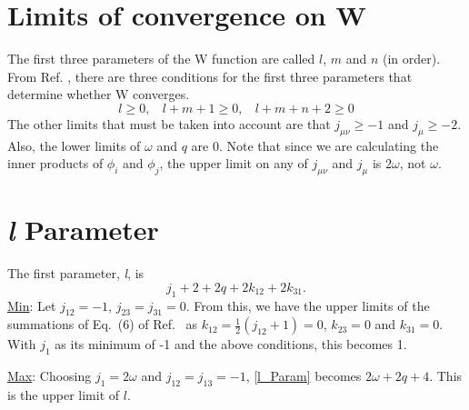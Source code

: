 \documentclass[Dissertation.tex]{subfiles}
\begin{document}
\section{Limits of convergence on W}

The first three parameters of the W function are called $l$, $m$ and $n$
(in order). From Ref. \cite{Drake1995}, there are three conditions for the first
three parameters that determine whether W converges.
\[l \geq 0, ~~~~ l+m+1 \geq 0, ~~~~ l+m+n+2 \geq 0\]
The other limits that must be taken into account are that $j_{\mu \nu} \geq -1$
and $j_{\mu} \geq -2$.
Also, the lower limits of $\omega$ and $q$ are 0.
Note that since we are calculating the inner products of $\phi_i$ and $\phi_j$,
the upper limit on any of $j_{\mu \nu}$ and $j_{\mu}$ is $2\omega$, not
$\omega$.

\section{\emph{l} Parameter}
The first parameter, \emph{l}, is
\begin{equation}
	\label{l_Param}j_1 + 2 + 2q + 2 k_{12} + 2 k_{31}.
\end{equation}
\underline{Min}: Let $j_{12} = -1$, $j_{23} = j_{31} = 0$. From this, we 
have the upper limits of the summations of Eq.~(6) of Ref.~\cite{Drake1995} as 
$k_{12} = \tfrac{1}{2} (j_{12} + 1) = 0$, $k_{23} = 0$ and $k_{31} = 0$. With 
$j_1$ as its minimum of -1 and the above conditions, this becomes 1.

\noindent\underline{Max}: Choosing $j_1 = 2 \omega$ and $j_{12} = j_{13} = -1$, \cref{l_Param} becomes $2 \omega + 2q + 4$.  This is the upper limit of $l$.
\end{document}
